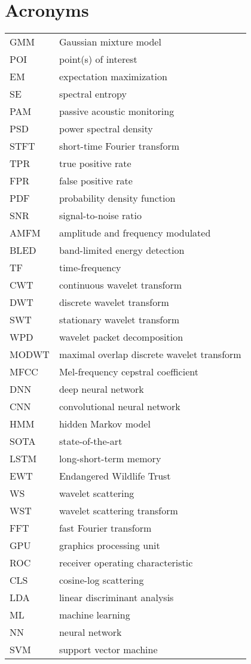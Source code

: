 \section*{Acronyms}
\begin{tabular}{p{} p{}}
    GMM & Gaussian mixture model \\
    POI & point(s) of interest \\
    EM & expectation maximization \\
    SE & spectral entropy \\
    PAM & passive acoustic monitoring \\
    PSD & power spectral density \\
    STFT & short-time Fourier transform \\
    TPR & true positive rate \\
    FPR & false positive rate \\
    PDF & probability density function \\
    SNR & signal-to-noise ratio \\
    AMFM & amplitude and frequency modulated \\
    BLED & band-limited energy detection \\
    TF & time-frequency \\
    CWT & continuous wavelet transform \\
    DWT & discrete wavelet transform \\
    SWT & stationary wavelet transform \\
    WPD & wavelet packet decomposition \\
    MODWT & maximal overlap discrete wavelet transform \\
    MFCC & Mel-frequency cepstral coefficient \\
    DNN & deep neural network \\
    CNN & convolutional neural network \\
    HMM & hidden Markov model \\
    SOTA & state-of-the-art \\
    LSTM & long-short-term memory \\
    EWT & Endangered Wildlife Trust \\
    WS & wavelet scattering \\
    WST & wavelet scattering transform \\
    FFT & fast Fourier transform \\
    GPU & graphics processing unit \\
    ROC & receiver operating characteristic \\
    CLS & cosine-log scattering \\
    LDA & linear discriminant analysis \\
    ML & machine learning \\
    NN & neural network \\
    SVM & support vector machine \\
\end{tabular}

